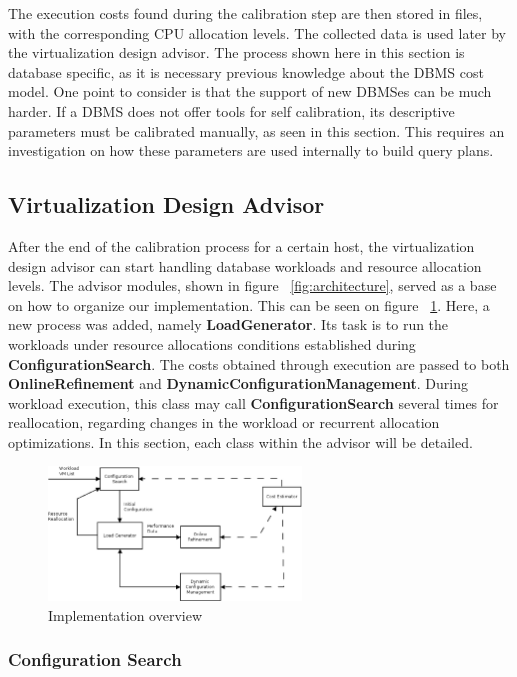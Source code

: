 \documentclass[jidm,a4paper]{jidm} %
\begin{document}
The execution costs found during the calibration step are then stored in files, with the corresponding CPU allocation levels. The collected data is used later by the virtualization design advisor. The process shown here in this section is database specific, as it is necessary previous knowledge about the DBMS cost model. One point to consider is that the support of new DBMSes can be much harder. If a DBMS does not offer tools for self calibration, its descriptive parameters must be calibrated manually, as seen in this section. This requires an investigation on how these parameters are used internally to build query plans.

\subsection{Virtualization Design Advisor}

After the end of the calibration process for a certain host, the virtualization design advisor can start handling database workloads and resource allocation levels. The advisor modules, shown in figure ~\ref{fig:architecture}, served as a base on how to organize our implementation. This can be seen on figure ~\ref{fig:advisor}. Here, a new process was added, namely \textbf{LoadGenerator}.  Its task is to run the workloads under resource allocations conditions established during \textbf{ConfigurationSearch}. The costs obtained through execution are passed to both \textbf{OnlineRefinement} and \textbf{DynamicConfigurationManagement}. During workload execution, this class may call \textbf{ConfigurationSearch} several times for reallocation, regarding changes in the workload or recurrent allocation optimizations. In this section, each class within the advisor will be detailed.


\begin{figure}[ht]
\centering
\includegraphics[width=0.6\textwidth]{advisor-arch.eps}
\caption{Implementation overview}
\label{fig:advisor}
\end{figure} 

\subsubsection{Configuration Search}
\end{document}

